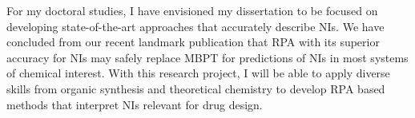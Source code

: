 \documentclass[11pt]{article}
\begin{document}
For my doctoral studies, I have envisioned my dissertation
to be focused on developing state-of-the-art approaches that accurately
describe NIs. We have concluded from our recent landmark publication that
RPA with its superior accuracy for NIs may safely replace MBPT for predictions
of NIs in most systems of chemical interest.\autocite{Nguyen20JChemTheoryComput16p2258}
With this research project, I will be able to apply diverse skills from
organic synthesis and theoretical chemistry to develop RPA based methods
that interpret NIs relevant for drug design.

\printbibliography
\end{document}
